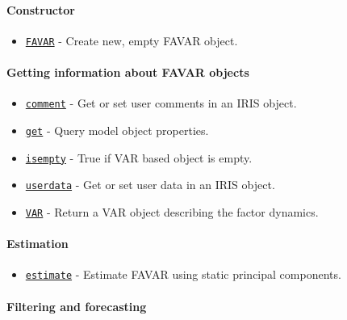 

	\paragraph{Constructor}\label{constructor}

\begin{itemize}
\itemsep1pt\parskip0pt
\item
  \href{FAVAR/FAVAR}{\texttt{FAVAR}} - Create new, empty FAVAR object.
\end{itemize}

\paragraph{Getting information about FAVAR
objects}\label{getting-information-about-favar-objects}

\begin{itemize}
\itemsep1pt\parskip0pt
\item
  \href{FAVAR/comment}{\texttt{comment}} - Get or set user comments in
  an IRIS object.
\item
  \href{FAVAR/get}{\texttt{get}} - Query model object properties.
\item
  \href{FAVAR/isempty}{\texttt{isempty}} - True if VAR based object is
  empty.
\item
  \href{FAVAR/userdata}{\texttt{userdata}} - Get or set user data in an
  IRIS object.
\item
  \href{FAVAR/VAR}{\texttt{VAR}} - Return a VAR object describing the
  factor dynamics.
\end{itemize}

\paragraph{Estimation}\label{estimation}

\begin{itemize}
\itemsep1pt\parskip0pt
\item
  \href{FAVAR/estimate}{\texttt{estimate}} - Estimate FAVAR using static
  principal components.
\end{itemize}

\paragraph{Filtering and forecasting}\label{filtering-and-forecasting}

